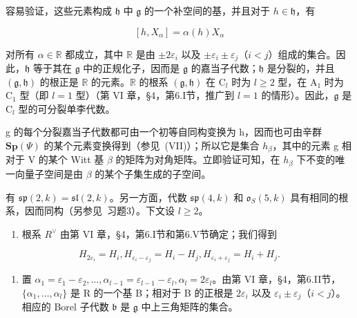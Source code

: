 容易验证，这些元素构成 \(\mathfrak{h}\) 中 \(\mathfrak{g}\) 的一个补空间的基，并且对于 \(h\in \mathfrak{h}\)，有

\[
[ h, X _ {\alpha} ] = \alpha (h) X _ {\alpha}\tag{7}
\]

对所有 \(\alpha \in \mathbb{R}\) 都成立，其中 \(\mathbb{R}\) 是由 \(\pm 2\varepsilon_{i}\) 以及 \(\pm \varepsilon_{i} \pm \varepsilon_{j}\)（\(i < j\)）组成的集合。因此，\(\mathfrak{h}\) 等于其在 \(\mathfrak{g}\) 中的正规化子，因而是 \(\mathfrak{g}\) 的嘉当子代数；\(\mathfrak{h}\) 是分裂的，并且 \((\mathfrak{g}, \mathfrak{h})\) 的根正是 \(\mathbb{R}\) 的元素。\(\mathbb{R}\) 的根系 \((\mathfrak{g}, \mathfrak{h})\) 在 \(\mathrm{C}_{l}\) 时为 \(l \geq 2\) 型，在 \(\mathrm{A}_{1}\) 时为 \(\mathrm{C}_{1}\) 型（即 \(l = 1\) 型）（第 VI 章，§4，第6.I节，推广到 \(l = 1\) 的情形）。因此，\(\mathfrak{g}\) 是 \(\mathrm{C}_{l}\) 型的可分裂单李代数。

g 的每个分裂嘉当子代数都可由一个初等自同构变换为 h，因而也可由辛群 \(\mathbf{Sp}(\varPsi)\) 的某个元素变换得到（参见~(VII)）；所以它是集合 \(h_{\beta}\)，其中的元素 g 相对于 V 的某个 Witt 基 \(\beta\) 的矩阵为对角矩阵。立即验证可知，在 \(h_{\beta}\) 下不变的唯一向量子空间是由 \(\beta\) 的某个子集生成的子空间。

有 \(\mathfrak{sp}(2,k) = \mathfrak{sl}(2,k)\)。另一方面，代数 \(\mathfrak{sp}(4,k)\) 和 \(\mathfrak{o}_S(5,k)\) 具有相同的根系，因而同构（另参见~习题3）。下文设 \(l \geq 2\)。

\begin{enumerate}
\def\labelenumi{(\Roman{enumi})}
\setcounter{enumi}{1}
\tightlist
\item
根系 \(R^{\vee}\) 由第 VI 章，§4，第6.I节和第6.V节确定；我们得到
\end{enumerate}

\[
H _ {2 \varepsilon_ {i}} = H _ {i}, H _ {\varepsilon_ {i} - \varepsilon_ {j}} = H _ {i} - H _ {j}, H _ {\varepsilon_ {i} + \varepsilon_ {j}} = H _ {i} + H _ {j}.
\]

\begin{enumerate}
\def\labelenumi{(\Roman{enumi})}
\setcounter{enumi}{2}
\tightlist
\item
置 \(\alpha_{1} = \varepsilon_{1} - \varepsilon_{2},\ldots ,\alpha_{l - 1} = \varepsilon_{l - 1} - \varepsilon_{l},\alpha_{l} = 2\varepsilon_{l}\)。由第 VI 章，§4，第6.II节，\(\{\alpha_1,\dots ,\alpha_l\}\) 是 R 的一个基 B；相对于 B 的正根是 \(2\varepsilon_{i}\) 以及 \(\varepsilon_{i}\pm \varepsilon_{j}\)（\(i < j\)）。相应的 Borel 子代数 \(\mathfrak{b}\) 是 \(\mathfrak{g}\) 中上三角矩阵的集合。
\end{enumerate}

